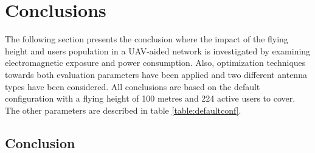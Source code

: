 \chapter{Conclusions}
\label{chap:conclusions}

The following section presents the conclusion where the impact of the flying height and users population in a \gls{UAV}-aided network
is investigated by examining electromagnetic exposure and power consumption. Also, optimization techniques towards both evaluation 
parameters have been applied and two different antenna types have been considered.
All conclusions are based on the default configuration with a flying height of 100 metres and 224 active users to cover.
The other parameters are described in table \ref{table:defaultconf}.

\section{Conclusion}


